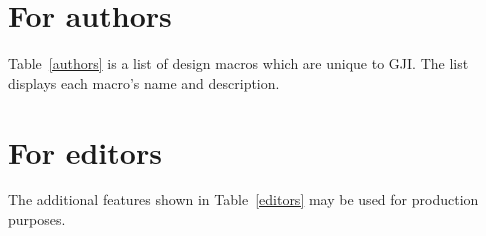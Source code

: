 \documentclass{gji}
\begin{document}
\appendix
\section{For authors}

Table~\ref{authors} is a list of design macros which are unique to GJI. The
list displays each macro's name and description.

\section{For editors}

The additional features shown in Table~\ref{editors} may be used for
production purposes.

\bsp %

\label{lastpage}
\end{document}

